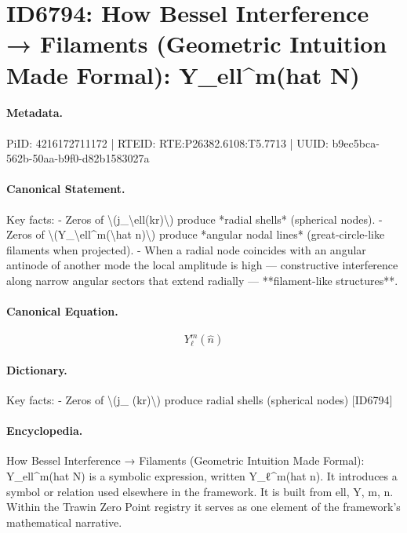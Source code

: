 \section*{ID6794: How Bessel Interference → Filaments (Geometric Intuition Made Formal): Y\_ell\textasciicircum{}m(hat N)}
\paragraph{Metadata.}
PiID: 4216172711172 | RTEID: RTE:P26382.6108:T5.7713 | UUID: b9ec5bca-562b-50aa-b9f0-d82b1583027a

\paragraph{Canonical Statement.}
Key facts: - Zeros of \textbackslash{}(j\_\textbackslash{}ell(kr)\textbackslash{}) produce *radial shells* (spherical nodes). - Zeros of \textbackslash{}(Y\_\textbackslash{}ell\textasciicircum{}m(\textbackslash{}hat n)\textbackslash{}) produce *angular nodal lines* (great-circle-like filaments when projected). - When a radial node coincides with an angular antinode of another mode the local amplitude is high — constructive interference along narrow angular sectors that extend radially — **filament-like structures**.

\paragraph{Canonical Equation.}
\[
Y_\ell^m(\hat n)
\]

\paragraph{Dictionary.}
Key facts: - Zeros of \textbackslash{}(j\_ (kr)\textbackslash{}) produce radial shells (spherical nodes) [ID6794]

\paragraph{Encyclopedia.}
How Bessel Interference → Filaments (Geometric Intuition Made Formal): Y\_ell\textasciicircum{}m(hat N) is a symbolic expression, written Y\_ℓ\textasciicircum{}m(hat n). It introduces a symbol or relation used elsewhere in the framework. It is built from ell, Y, m, n. Within the Trawin Zero Point registry it serves as one element of the framework's mathematical narrative.
